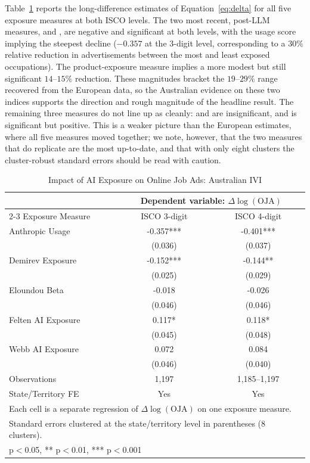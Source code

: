 \documentclass[11pt]{article}
\begin{document}
Table~\ref{table:aus_delta} reports the long-difference estimates of Equation~\ref{eq:delta} for all five exposure measures at both ISCO levels. The two most recent, post-LLM measures, \citet{handa2025economic} and \citet{demirev2024assessing}, are negative and significant at both levels, with the \citet{handa2025economic} usage score implying the steepest decline ($-0.357$ at the 3-digit level, corresponding to a $30\%$ relative reduction in advertisements between the most and least exposed occupations). The \citet{demirev2024assessing} product-exposure measure implies a more modest but still significant $14$--$15\%$ reduction. These magnitudes bracket the $19$--$29\%$ range recovered from the European data, so the Australian evidence on these two indices supports the direction and rough magnitude of the headline result. The remaining three measures do not line up as cleanly: \citet{webb_impact_2022} and \citet{eloundou_gpts_2023} are insignificant, and \citet{felten_method_2018} is significant but positive. This is a weaker picture than the European estimates, where all five measures moved together; we note, however, that the two measures that do replicate are the most up-to-date, and that with only eight clusters the cluster-robust standard errors should be read with caution.

\begin{table}[H]
\centering
\caption{Impact of AI Exposure on Online Job Ads: Australian IVI}
\begin{tabular}{lcc}
\hline\hline
 & \multicolumn{2}{c}{Dependent variable: $\Delta \log(\text{OJA})$} \\
\cmidrule(lr){2-3}
Exposure Measure & ISCO 3-digit & ISCO 4-digit \\
\midrule
Anthropic Usage & -0.357*** & -0.401*** \\
 & (0.036) & (0.037) \\
Demirev Exposure & -0.152*** & -0.144** \\
 & (0.025) & (0.029) \\
Eloundou Beta & -0.018 & -0.026 \\
 & (0.046) & (0.046) \\
Felten AI Exposure & 0.117* & 0.118* \\
 & (0.045) & (0.048) \\
Webb AI Exposure & 0.072 & 0.084 \\
 & (0.046) & (0.040) \\
\midrule
Observations & 1,197 & 1,185--1,197 \\
State/Territory FE & Yes & Yes \\
\hline\hline
\multicolumn{3}{l}{\footnotesize Each cell is a separate regression of $\Delta \log(\text{OJA})$ on one exposure measure.} \\
\multicolumn{3}{l}{\footnotesize Standard errors clustered at the state/territory level in parentheses (8 clusters).} \\
\multicolumn{3}{l}{\footnotesize * p$<$0.05, ** p$<$0.01, *** p$<$0.001} \\
\end{tabular}
\label{table:aus_delta}
\end{table}
\end{document}
